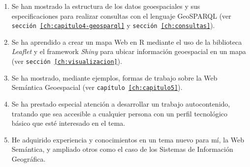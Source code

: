 \begin{enumerate}
	\item Se han mostrado la estructura de los datos geoespaciales y sus especificaciones para realizar consultas con el lenguaje GeoSPARQL (ver \texttt{sección \ref{ch:capitulo4-geosparql}} y \texttt{sección \ref{ch:consultas}}).
	
	\item Se ha aprendido a crear un mapa Web en R mediante el uso de la biblioteca \textit{Leaflet} y el framework \textit{Shiny} para ubicar información geoespacial en un mapa (ver \texttt{sección \ref{ch:visualizacion}}).
	
	\item Se ha mostrado, mediante ejemplos, formas de trabajo sobre la Web Semántica Geoespacial (ver \texttt{capítulo \ref{ch:capitulo5}}).
	
	\item Se ha prestado especial atención a desarrollar un trabajo autocontenido, tratando que sea accesible a cualquier persona con un perfil tecnológico básico que esté interesado en el tema.
	
	
	\item He adquirido experiencia y conocimientos en un tema nuevo para mí, la Web Semántica, y ampliado otros como el caso de los Sistemas de Información Geográfica.
	
	

	
\end{enumerate}



